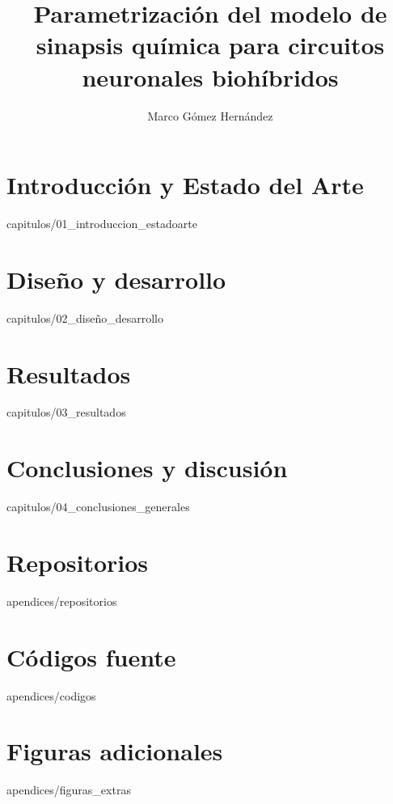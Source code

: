 \documentclass[epsbased,copyright,final,printable,covers,extendedindex,firstnumbered,tfg,gnuplot,loc,loe,lof]{tfgtfmthesisuam}
\title{Parametrización del modelo de sinapsis química para circuitos neuronales biohíbridos}
\author{Marco Gómez Hernández}
\begin{document}
\chapter{Introducción y Estado del Arte\label{CAP:INTRODUCCIONYESTADOARTE}}{capitulos/01_introduccion_estadoarte}

\chapter{Diseño y desarrollo\label{CAP:DISEÑOYDESARROLLO}}{capitulos/02_diseño_desarrollo}

\chapter{Resultados\label{CAP:RESULTADOS}}{capitulos/03_resultados}

\chapter{Conclusiones y discusión\label{CAP:CONCLUSIONES}}{capitulos/04_conclusiones_generales}


\appendix

\chapter{Repositorios\label{CAP:REPOSITORIOSREPO}}{apendices/repositorios}

\chapter{Códigos fuente\label{CAP:CODIGOSFUENTE}}{apendices/codigos}

\chapter{Figuras adicionales\label{CAP:FIGURASADICIONALES}}{apendices/figuras_extras}
\end{document}
